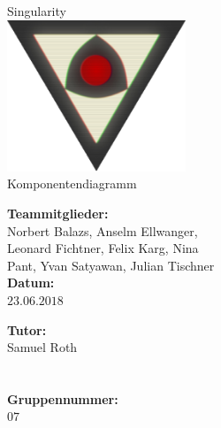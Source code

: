 \documentclass[12pt]{article}
\newcommand{\changefont}[4]{{\fontfamily{#1}\fontsize{#2}{#3}\selectfont #4}} %
\begin{document}
\renewcommand{\figurename}{Fig.}%
\renewcommand{\arraystretch}{1.4}%

\begin{titlepage}
    \begin{center}
        \changefont{pbk}{32}{35}{Singularity}\\\vspace{3em}
        \includegraphics[width=0.4\textwidth]{res/SingularityLogo2.png}\\\vspace{5em}
        \changefont{cmr}{32}{35}{Komponentendiagramm}
    \end{center}
    \vspace{7em}

    \begin{minipage}[t]{.5\textwidth}
        \begin{center}
            \textbf{Teammitglieder:}\\
            \vspace{.5em}
            Norbert Balazs, Anselm Ellwanger,\\
            Leonard Fichtner, Felix Karg, Nina\\
            Pant, Yvan Satyawan, Julian Tischner\\
            \vspace{2em}
            \textbf{Datum:}\\
            \vspace{.5em}
            $23.06.2018$
        \end{center}
    \end{minipage}
    \begin{minipage}[t]{.5\textwidth}
        \begin{center}
            \textbf{Tutor:}\\
            \vspace{.5em}
            Samuel Roth\\
            \quad\\
            \quad\\
            \vspace{2em}
            \textbf{Gruppennummer:}\\
            \vspace{.5em}
            $07$
        \end{center}
    \end{minipage}
\end{titlepage}
\end{document}
